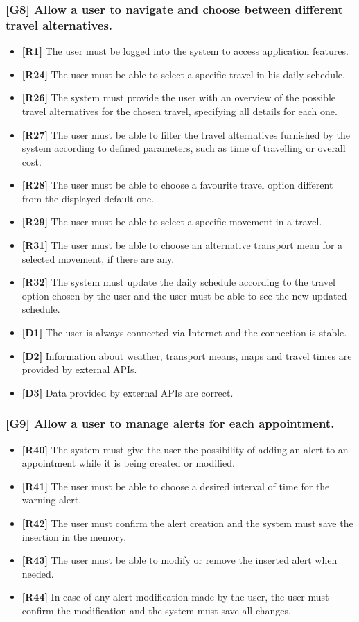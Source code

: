 \subsubsection{[G8] Allow a user to navigate and choose between different travel alternatives.}
\begin{itemize}
	\item \textbf{[R1]} The user must be logged into the system to access application features. 
	\item \textbf{[R24]} The user must be able to select a specific travel in his daily schedule.
	\item \textbf{[R26]} The system must provide the user with an overview of the possible travel alternatives for the chosen travel, specifying all details for each one.
	\item \textbf{[R27]} The user must be able to filter the travel alternatives furnished by the system according to defined parameters, such as time of travelling or overall cost.
	\item \textbf{[R28]} The user must be able to choose a favourite travel option different from the displayed default one.
	\item \textbf{[R29]} The user must be able to select a specific movement in a travel.
	\item \textbf{[R31]} The user must be able to choose an alternative transport mean for a selected movement, if there are any.
	\item \textbf{[R32]} The system must update the daily schedule according to the travel option chosen by the user and the user must be able to see the new updated schedule.
	\item \textbf{[D1]} The user is always connected via Internet and the connection is stable.
	\item \textbf{[D2]} Information about weather, transport means, maps and travel times are provided by external APIs.
	\item \textbf{[D3]} Data provided by external APIs are correct.
\end{itemize}

\subsubsection{[G9] Allow a user to manage alerts for each appointment.}
\begin{itemize}
	\item \textbf{[R40]} The system must give the user the possibility of adding an alert to an appointment while it is being created or modified.
	\item \textbf{[R41]} The user must be able to choose a desired interval of time for the warning alert.
	\item \textbf{[R42]} The user must confirm the alert creation and the system must save the insertion in the memory.
	\item \textbf{[R43]} The user must be able to modify or remove the inserted alert when needed.
	\item \textbf{[R44]} In case of any alert modification made by the user, the user must confirm the modification and the system must save all changes.
\end{itemize}

